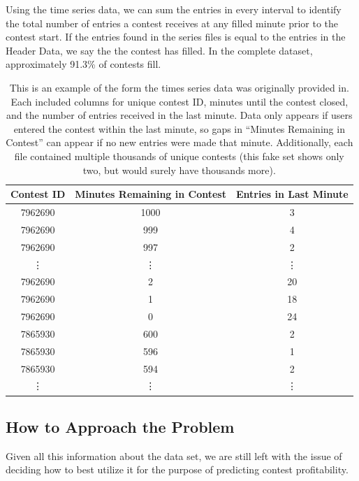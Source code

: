 Using the time series data, we can sum the entries in every interval to identify the total number of entries a contest receives at any filled minute prior to the contest start. If the entries found in the series files is equal to the entries in the Header Data, we say the the contest has filled. In the complete dataset, approximately 91.3\% of contests fill. 

\begin{table}
\centering
\begin{tabular}{| c | c | c |}
\hline
\textbf{Contest ID} & \textbf{Minutes Remaining in Contest} & \textbf{Entries in Last Minute}  \\ 
\hline
7962690 & 1000 & 3  \\  
\hline
7962690 & 999 & 4   \\
\hline
7962690 & 997 & 2   \\
\hline
\vdots & \vdots & \vdots \\
\hline
7962690 & 2 & 20   \\
\hline
7962690 & 1 & 18   \\
\hline
7962690 & 0 & 24   \\
\hline
7865930 & 600 & 2  \\  
\hline
7865930 & 596 & 1   \\
\hline
7865930 & 594 & 2   \\
\hline
\vdots & \vdots & \vdots \\
\hline
\end{tabular}
\caption[Raw Time Series Data Example]{This is an example of the form the times series data was originally provided in. Each included columns for unique contest ID, minutes until the contest closed, and the number of entries received in the last minute. Data only appears if users entered the contest within the last minute, so gaps in ``Minutes Remaining in Contest'' can appear if no new entries were made that minute. Additionally, each file contained multiple thousands of unique contests (this fake set shows only two, but would surely have thousands more).}
\label{tab:series}
\end{table}

\subsection{How to Approach the Problem}
Given all this information about the data set, we are still left with the issue of deciding how to best utilize it for the purpose of predicting contest profitability. 

